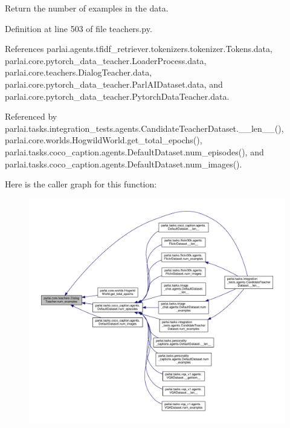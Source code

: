 \begin{DoxyVerb}Return the number of examples in the data.\end{DoxyVerb}
 

Definition at line 503 of file teachers.\+py.



References parlai.\+agents.\+tfidf\+\_\+retriever.\+tokenizers.\+tokenizer.\+Tokens.\+data, parlai.\+core.\+pytorch\+\_\+data\+\_\+teacher.\+Loader\+Process.\+data, parlai.\+core.\+teachers.\+Dialog\+Teacher.\+data, parlai.\+core.\+pytorch\+\_\+data\+\_\+teacher.\+Parl\+A\+I\+Dataset.\+data, and parlai.\+core.\+pytorch\+\_\+data\+\_\+teacher.\+Pytorch\+Data\+Teacher.\+data.



Referenced by parlai.\+tasks.\+integration\+\_\+tests.\+agents.\+Candidate\+Teacher\+Dataset.\+\_\+\+\_\+len\+\_\+\+\_\+(), parlai.\+core.\+worlds.\+Hogwild\+World.\+get\+\_\+total\+\_\+epochs(), parlai.\+tasks.\+coco\+\_\+caption.\+agents.\+Default\+Dataset.\+num\+\_\+episodes(), and parlai.\+tasks.\+coco\+\_\+caption.\+agents.\+Default\+Dataset.\+num\+\_\+images().

Here is the caller graph for this function\+:
\nopagebreak
\begin{figure}[H]
\begin{center}
\leavevmode
\includegraphics[width=350pt]{classparlai_1_1core_1_1teachers_1_1DialogTeacher_ad90c8cac27f2db22db77e29828b94dfe_icgraph}
\end{center}
\end{figure}
\mbox{\label{classparlai_1_1core_1_1teachers_1_1DialogTeacher_a393f94ea28e1733f575a9f36a0b43c18}} 
